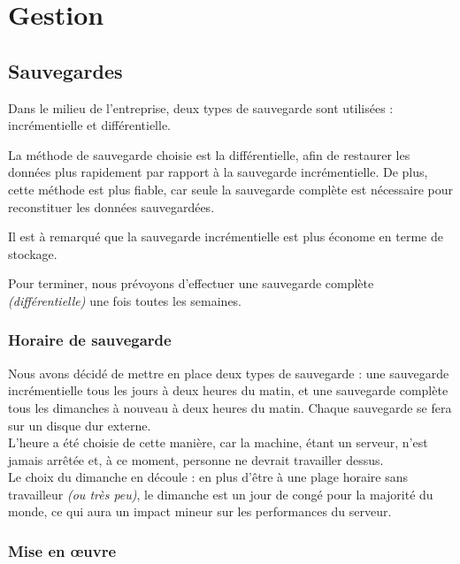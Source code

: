 \chapter*{Gestion}
\label{ch:gestion}


\section{Sauvegardes}
\label{subsec:sauvegardes}

Dans le milieu de l'entreprise, deux types de sauvegarde sont utilisées :
incrémentielle et différentielle.

La méthode de sauvegarde choisie est la différentielle, afin de restaurer les
données plus rapidement par rapport à la sauvegarde incrémentielle. De plus,
cette méthode est plus fiable, car seule la sauvegarde complète est nécessaire
pour reconstituer les données sauvegardées.

Il est à remarqué que la sauvegarde incrémentielle est plus économe en terme de
stockage.

Pour terminer, nous prévoyons d'effectuer une sauvegarde complète
\textit{(différentielle)} une fois toutes les semaines.

\newpage


\subsection{Horaire de sauvegarde}
\label{subsec:horaire-sauvegarde}

Nous avons décidé de mettre en place deux types de sauvegarde : une sauvegarde
incrémentielle tous les jours à deux heures du matin, et une sauvegarde complète
tous les dimanches à nouveau à deux heures du matin. Chaque sauvegarde se fera
sur un disque dur externe. \\

L'heure a été choisie de cette manière, car la machine, étant un serveur, n'est
jamais arrêtée et, à ce moment, personne ne devrait travailler dessus. \\
Le choix du dimanche en découle : en plus d'être à une plage horaire sans
travailleur \textit{(ou très peu)}, le dimanche est un jour de congé pour la
majorité du monde, ce qui aura un impact mineur sur les performances du serveur.


\subsection{Mise en \oe{}uvre}
\label{subsec:mise-en-oeuvre)}

